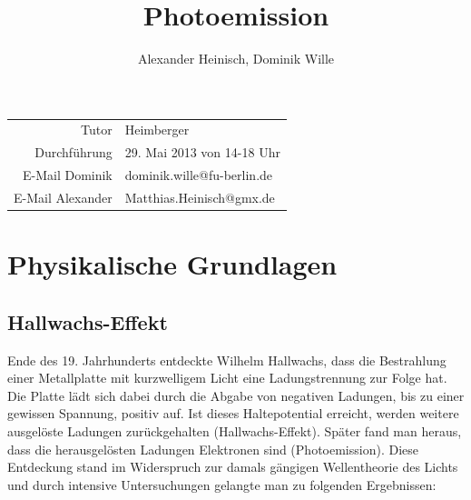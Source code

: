\documentclass{article}
\title{Photoemission}
\author{Alexander Heinisch, Dominik Wille}
\begin{document}
\maketitle

\begin{center}
\begin{minipage}{\linewidth}
\centering
{}
\label{ringe}
\end{minipage}
\end{center}

\vspace{7cm}
\noindent
\begin{center}
\begin{tabular}{r l}
Tutor & Heimberger\\
Durchführung & 29. Mai 2013 von 14-18 Uhr \\

E-Mail Dominik & dominik.wille@fu-berlin.de \\
E-Mail Alexander & Matthias.Heinisch@gmx.de \\
\end{tabular}
\end{center}

\newpage
\tableofcontents
\newpage

\section{Physikalische Grundlagen}

\subsection{Hallwachs-Effekt}
Ende des 19. Jahrhunderts entdeckte Wilhelm Hallwachs, dass die Bestrahlung einer Metallplatte mit kurzwelligem Licht eine Ladungstrennung zur Folge hat. Die Platte lädt sich dabei durch die Abgabe von negativen Ladungen, bis zu einer gewissen Spannung, positiv auf. Ist dieses Haltepotential erreicht, werden weitere ausgelöste Ladungen zurückgehalten (Hallwachs-Effekt). Später fand man heraus, dass die herausgelösten Ladungen Elektronen sind (Photoemission).
Diese Entdeckung stand im Widerspruch zur damals gängigen Wellentheorie des Lichts und durch intensive Untersuchungen gelangte man zu folgenden Ergebnissen:
\end{document}
